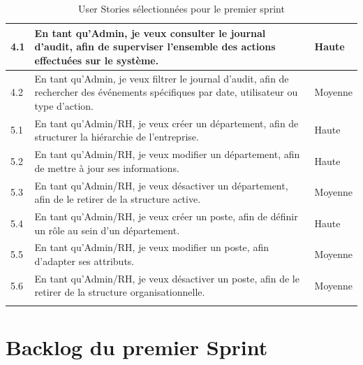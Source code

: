 \begin{small}
\begin{longtable}{|p{1.2cm}|p{9.5cm}|p{2.3cm}|}
4.1 & En tant qu'Admin, je veux consulter le journal d'audit, afin de superviser l'ensemble des 
actions effectuées sur le système. & Haute \\ \hline
4.2 & En tant qu'Admin, je veux filtrer le journal d'audit, afin de rechercher des événements 
spécifiques par date, utilisateur ou type d'action. & Moyenne \\ \hline
5.1 & En tant qu'Admin/RH, je veux créer un département, afin de structurer la hiérarchie de 
l'entreprise. & Haute \\ \hline
5.2 & En tant qu'Admin/RH, je veux modifier un département, afin de mettre à jour ses 
informations. & Haute \\ \hline
5.3 & En tant qu'Admin/RH, je veux désactiver un département, afin de le retirer de la structure 
active. & Moyenne \\ \hline
5.4 & En tant qu'Admin/RH, je veux créer un poste, afin de définir un rôle au sein d'un 
département. & Haute \\ \hline
5.5 & En tant qu'Admin/RH, je veux modifier un poste, afin d'adapter ses attributs. & Moyenne \\ \hline
5.6 & En tant qu'Admin/RH, je veux désactiver un poste, afin de le retirer de la structure 
organisationnelle. & Moyenne \\ \hline

\caption{User Stories sélectionnées pour le premier sprint}
\label{tab:sprint1-us}
\end{longtable}
\end{small}
\renewcommand{\arraystretch}{1}
\section{Backlog du premier Sprint}
\label{sec:s1-backlog}

